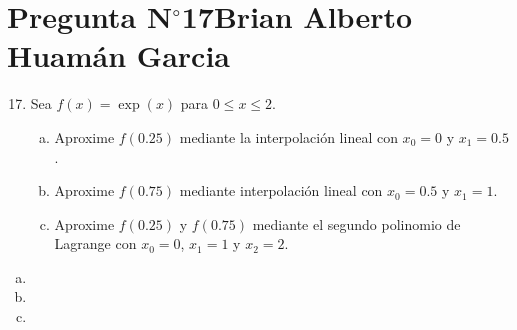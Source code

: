 \section{Pregunta N$^{\circ}$17\qquad Brian Alberto Huamán Garcia}

\begin{frame}
	\begin{enumerate}\setcounter{enumi}{16}
		\item

		      Sea
		      \begin{math}
			      f\left(x\right)=
			      \exp\left(x\right)
		      \end{math}
		      para $0\leq x\leq 2$.

		      \begin{enumerate}[a)]
			      \item

			            Aproxime $f\left(0.25\right)$ mediante la
			            interpolación lineal con $x_{0}=0$ y $x_{1}=0.5$.

			      \item

			            Aproxime $f\left(0.75\right)$ mediante
			            interpolación lineal con $x_{0}=0.5$ y $x_{1}=1$.

			      \item

			            Aproxime $f\left(0.25\right)$ y
			            $f\left(0.75\right)$ mediante el segundo polinomio
			            de Lagrange con $x_{0}=0$, $x_{1}=1$ y $x_{2}=2$.
		      \end{enumerate}
	\end{enumerate}

	\begin{solution}
		\begin{enumerate}[a)]
			\item

			\item

			\item
		\end{enumerate}
	\end{solution}
\end{frame}